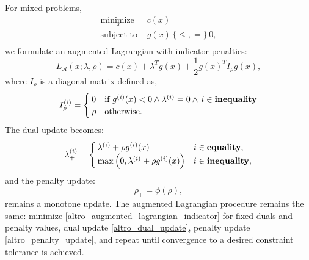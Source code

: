For mixed problems, 
\begin{equation}
	\begin{array}{ll}
		\underset{x}{\mbox{minimize }}  & c(x) \\
		\mbox{subject to } & g(x) \, \{\leq,=\}\, 0, \\
	\end{array}
	\label{altro_equality_inequality_constrained}
\end{equation}
we formulate an augmented Lagrangian with indicator penalties:
\begin{equation}
L_{\mathcal{A}}(x; \lambda, \rho) = c(x) + \lambda^T g(x)  +\frac{1}{2}g(x)^T I_{\rho} g(x), \label{altro_augmented_lagrangian_indicator}
\end{equation}
where $I_{\rho}$ is a diagonal matrix defined as,
\begin{equation}
	I_{\rho}^{(i)} = 
	\begin{cases} 
		0 & \text{if } g^{(i)}(x) < 0 \land \lambda^{(i)} = 0 \land \, i \in \mbox{\textbf{inequality}}\\
		\rho & \text{otherwise} .
	\end{cases}
\end{equation}
The dual update becomes:
\begin{equation}\label{altro_dual_update}
	\lambda_{+}^{(i)} = \begin{cases}
		\lambda^{(i)} + \rho g^{(i)}(x) & i \in \mbox{\textbf{equality}}, \\
		\max \Big(0, \lambda^{(i)} + \rho g^{(i)}(x)\Big) & i \in \mbox{\textbf{inequality}},
	\end{cases}
\end{equation} 
and the penalty update:
\begin{equation}\label{altro_penalty_update}
	\rho_{+} = \phi(\rho),
\end{equation}
remains a monotone update. The augmented Lagrangian procedure remains the same: minimize \eqref{altro_augmented_lagrangian_indicator} for fixed duals and penalty values, dual update \eqref{altro_dual_update}, penalty update \eqref{altro_penalty_update}, and repeat until convergence to a desired constraint tolerance is achieved.

